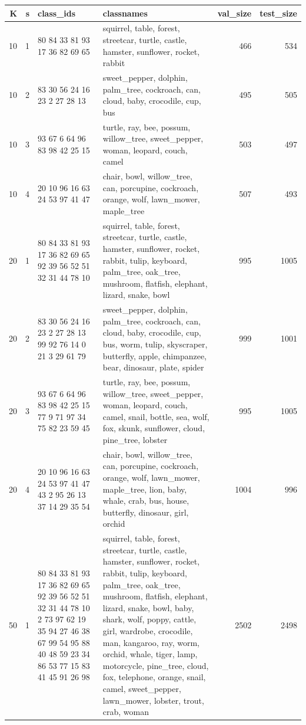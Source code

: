 \begin{tabular}{rrllrr}
\toprule
K & s & class_ids & classnames & val_size & test_size \\
\midrule
10 & 1 & 80 84 33 81 93 17 36 82 69 65 & squirrel, table, forest, streetcar, turtle, castle, hamster, sunflower, rocket, rabbit & 466 & 534 \\
10 & 2 & 83 30 56 24 16 23 2 27 28 13 & sweet_pepper, dolphin, palm_tree, cockroach, can, cloud, baby, crocodile, cup, bus & 495 & 505 \\
10 & 3 & 93 67 6 64 96 83 98 42 25 15 & turtle, ray, bee, possum, willow_tree, sweet_pepper, woman, leopard, couch, camel & 503 & 497 \\
10 & 4 & 20 10 96 16 63 24 53 97 41 47 & chair, bowl, willow_tree, can, porcupine, cockroach, orange, wolf, lawn_mower, maple_tree & 507 & 493 \\
20 & 1 & 80 84 33 81 93 17 36 82 69 65 92 39 56 52 51 32 31 44 78 10 & squirrel, table, forest, streetcar, turtle, castle, hamster, sunflower, rocket, rabbit, tulip, keyboard, palm_tree, oak_tree, mushroom, flatfish, elephant, lizard, snake, bowl & 995 & 1005 \\
20 & 2 & 83 30 56 24 16 23 2 27 28 13 99 92 76 14 0 21 3 29 61 79 & sweet_pepper, dolphin, palm_tree, cockroach, can, cloud, baby, crocodile, cup, bus, worm, tulip, skyscraper, butterfly, apple, chimpanzee, bear, dinosaur, plate, spider & 999 & 1001 \\
20 & 3 & 93 67 6 64 96 83 98 42 25 15 77 9 71 97 34 75 82 23 59 45 & turtle, ray, bee, possum, willow_tree, sweet_pepper, woman, leopard, couch, camel, snail, bottle, sea, wolf, fox, skunk, sunflower, cloud, pine_tree, lobster & 995 & 1005 \\
20 & 4 & 20 10 96 16 63 24 53 97 41 47 43 2 95 26 13 37 14 29 35 54 & chair, bowl, willow_tree, can, porcupine, cockroach, orange, wolf, lawn_mower, maple_tree, lion, baby, whale, crab, bus, house, butterfly, dinosaur, girl, orchid & 1004 & 996 \\
50 & 1 & 80 84 33 81 93 17 36 82 69 65 92 39 56 52 51 32 31 44 78 10 2 73 97 62 19 35 94 27 46 38 67 99 54 95 88 40 48 59 23 34 86 53 77 15 83 41 45 91 26 98 & squirrel, table, forest, streetcar, turtle, castle, hamster, sunflower, rocket, rabbit, tulip, keyboard, palm_tree, oak_tree, mushroom, flatfish, elephant, lizard, snake, bowl, baby, shark, wolf, poppy, cattle, girl, wardrobe, crocodile, man, kangaroo, ray, worm, orchid, whale, tiger, lamp, motorcycle, pine_tree, cloud, fox, telephone, orange, snail, camel, sweet_pepper, lawn_mower, lobster, trout, crab, woman & 2502 & 2498 \\

\end{tabular}
